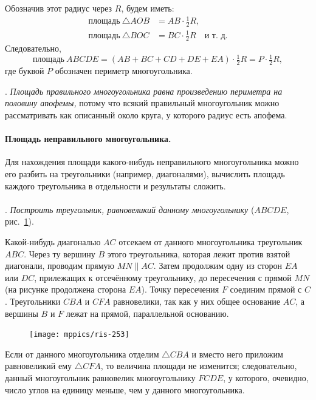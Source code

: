 \documentclass[oneside]{book}
\begin{document}
Обозначив этот радиус через $R$, будем иметь:
\begin{align*}
\text{площадь}~\triangle AOB&=AB \cdot  \tfrac12R,
\\
\text{площадь}~\triangle BOC &= BC \cdot  \tfrac12R\quad\text{и~т.~д.}
\end{align*}
Следовательно,
\[\text{площадь}~ABCDE = (AB+BC+CD+DE+EA) \cdot  \tfrac12R= P \cdot \tfrac12R,\]
где буквой $P$ обозначен периметр многоугольника.

\smallskip
{}.
\emph{Площадь правильного многоугольника равна произведению периметра на половину апофемы,} потому что всякий правильный многоугольник можно рассматривать как описанный около круга, у которого радиус есть апофема.

\paragraph{Площадь неправильного многоугольника.}\label{1938/253}
Для нахождения площади какого-нибудь неправильного многоугольника можно его разбить на треугольники (например, диагоналями), вычислить площадь каждого треугольника в отдельности и результаты сложить.

\paragraph{}\label{1938/254}
\mbox{.}
\emph{Построить треугольник, равновеликий данному многоугольнику} ($ABCDE$, рис.~\ref{1938/ris-253}).

Какой-нибудь диагональю $AC$ отсекаем от данного многоугольника треугольник $ABC$.
Через ту вершину $B$ этого треугольника, которая лежит против взятой диагонали, проводим прямую $MN\parallel AC$.
Затем продолжим одну из сторон $EA$ или $DC$, прилежащих к отсечённому треугольнику, до пересечения с прямой $MN$ (на рисунке продолжена сторона $EA$).
Точку пересечения $F$ соединим прямой с $C$.
Треугольники $CBA$ и $CFA$ равновелики, так как у них общее основание $AC$, а вершины $B$ и $F$ лежат на прямой, параллельной основанию.

\begin{figure}
\centering
\texttt{[image: mppics/ris-253]}
\caption{}\label{1938/ris-253}
\end{figure}

Если от данного многоугольника отделим $\triangle CBA$ и вместо него приложим равновеликий ему $\triangle CFA$, то величина площади не изменится;
следовательно, данный многоугольник равновелик многоугольнику $FCDE$, у которого, очевидно, число углов на единицу меньше, чем у данного многоугольника.
\end{document}
